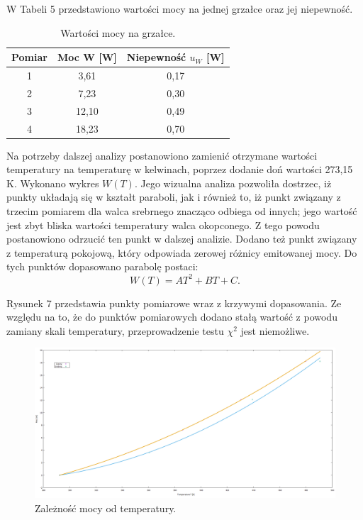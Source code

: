 \documentclass[10pt,a4paper]{article}
\begin{document}
W Tabeli 5 przedstawiono wartości mocy na jednej grzałce oraz jej niepewność.

\begin{table}[h!]
\centering
\caption{Wartości mocy na grzałce.}
\begin{tabular}{|c|c|c|}
\hline
Pomiar & Moc W [W] & Niepewność $u_{W}$ [W] \\ \hline
1      & 3,61      & 0,17                   \\ \hline
2      & 7,23      & 0,30                   \\ \hline
3      & 12,10     & 0,49                   \\ \hline
4      & 18,23     & 0,70                   \\ \hline
\end{tabular}
\end{table}

Na potrzeby dalszej analizy postanowiono zamienić otrzymane wartości temperatury na temperaturę w kelwinach, poprzez dodanie doń wartości 273,15 K. Wykonano wykres $W(T)$. Jego wizualna analiza pozwoliła dostrzec, iż punkty układają się w kształt paraboli, jak i również to, iż punkt związany z trzecim pomiarem dla walca srebrnego znacząco odbiega od innych; jego wartość jest zbyt bliska wartości temperatury walca okopconego. Z tego powodu postanowiono odrzucić ten punkt w dalszej analizie. Dodano też punkt związany z temperaturą pokojową, który odpowiada zerowej różnicy emitowanej mocy. Do tych punktów dopasowano parabolę postaci:
\begin{equation}
W(T)=AT^2+BT+C.
\end{equation}

Rysunek 7 przedstawia punkty pomiarowe wraz z krzywymi dopasowania. Ze względu na to, że do punktów pomiarowych dodano stałą wartość z powodu zamiany skali temperatury, przeprowadzenie testu $\chi^2$ jest niemożliwe.


\begin{figure}[h!]
\includegraphics[width=15cm]{rap11rys6} 
\centering
\caption{Zależność mocy od temperatury.}
\end{figure}
\end{document}
